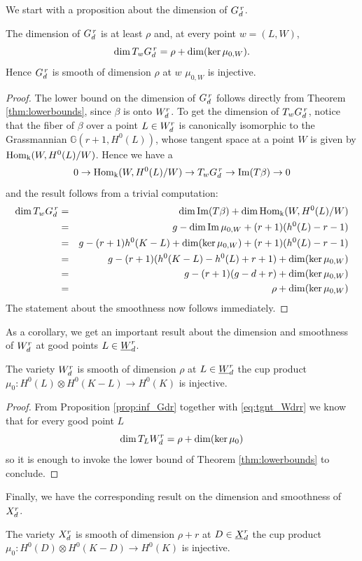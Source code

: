 	We start with a proposition about the dimension of $G_d^{\,r}$. 
	\begin{prop}\label{prop:inf_Gdr}
		The dimension of $G_d^{\,r}$ is at least $\rho$ and, at every point $w=(L,W)$,  
		$$ \dim T_w G_d^{\,r} = \rho + \dim( \ker \mu_{0,W} ) .$$ 
		Hence $G_d^{\,r}$ is smooth of dimension $\rho$ at $w$ \ABiff $\mu_{0,W}$ is injective.
	\end{prop}
	\begin{proof}
		The lower bound on the dimension of $G_d^{\,r}$ follows directly from Theorem \ref{thm:lowerbounds}, since $\beta$ is onto $W_d^r$. To get the dimension of $T_w G_d^{\,r}$, notice that the fiber of $\beta$ over a point $L\in W_d^r$ is canonically isomorphic to the Grassmannian $\mathbb{G}(r+1,H^0(L))$, whose tangent space at a point $W$ is given by $\operatorname{Hom_k}(W, H^0(L) / W)$. Hence we have a \ses
		$$ 0 \to  \operatorname{Hom_k}(W, H^0(L) / W)  \to  T_w G_d^{\,r}  \to  \operatorname{Im} (T\beta)  \to 0 $$
		and the result follows from a trivial computation:
		\begin{eqnarray*}
			\dim T_w G_d^{\,r}
			&=& \dim\operatorname{Im}(T\beta) + \dim\operatorname{Hom_k}(W, H^0(L) / W) \\
			&=& g-\dim\operatorname{Im}\mu_{0,W} + (r+1)(h^0(L)-r-1) \\
			&=& g-(r+1)h^0(K-L) +\dim(\ker\mu_{0,W}) + (r+1)(h^0(L)-r-1) \\
			&=& g-(r+1)(h^0(K-L) - h^0(L)+r+1) +\dim(\ker\mu_{0,W}) \\
			&=& g-(r+1)(g-d+r) +\dim(\ker\mu_{0,W}) \\
			&=& \rho +\dim(\ker\mu_{0,W})
		\end{eqnarray*}
		The statement about the smoothness now follows immediately.
	\end{proof}
	As a corollary, we get an important result about the dimension and smoothness of $W_d^r$ at good points $L\in \underline{W}_d^{r}$.
	\begin{coro}
		The variety $W_d^r$ is smooth of dimension $\rho$ at $L\in \underline{W}_d^{r}$ \ABiff the cup product $ \mu_{0} : H^0(L)\otimes H^0(K-L) \to H^0(K) $ is injective.
	\end{coro}
	\begin{proof}
		From Proposition \ref{prop:inf_Gdr} together with \eqref{eq:tgnt_Wdrr} we know that for every good point $L$ 
		$$ \dim T_L W_d^r = \rho +\dim(\ker\mu_0) $$
		so it is enough to invoke the lower bound of Theorem \ref{thm:lowerbounds} to conclude.
	\end{proof}
	Finally, we have the corresponding result on the dimension and smoothness of $X_d^r$.
	\begin{prop}
		The variety $X_d^r$ is smooth of dimension $\rho+r$ at $D\in \underline{X}_d^{r}$ \ABiff the cup product $ \mu_{0} : H^0(D)\otimes H^0(K-D) \to H^0(K) $ is injective.
	\end{prop}
